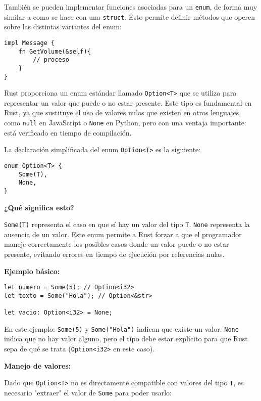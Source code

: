 \documentclass[12pt]{article}
\begin{document}
También se pueden implementar funciones asociadas para un \texttt{enum}, de forma muy similar a como se hace con una \texttt{struct}. Esto permite definir métodos que operen sobre las distintas variantes del enum:

\begin{lstlisting}[style=ruststyle]
impl Message {
	fn GetVolume(&self){
		// proceso
	} 
}
\end{lstlisting}

Rust proporciona un enum estándar llamado \texttt{Option<T>} que se utiliza para representar un valor que puede o no estar presente. Este tipo es fundamental en Rust, ya que sustituye el uso de valores nulos que existen en otros lenguajes, como \texttt{null} en JavaScript o \texttt{None} en Python, pero con una ventaja importante: está verificado en tiempo de compilación.

La declaración simplificada del enum \texttt{Option<T>} es la siguiente:

\begin{lstlisting}[style=ruststyle]
enum Option<T> {
	Some(T),
	None,
}
\end{lstlisting}

\textbf{¿Qué significa esto?}

\texttt{Some(T)} representa el caso en que sí hay un valor del tipo \texttt{T}. \texttt{None} representa la ausencia de un valor. Este enum permite a Rust forzar a que el programador maneje correctamente los posibles casos donde un valor puede o no estar presente, evitando errores en tiempo de ejecución por referencias nulas.

\textbf{Ejemplo básico:}

\begin{lstlisting}[style=ruststyle]
let numero = Some(5); // Option<i32>
let texto = Some("Hola"); // Option<&str>
	
let vacio: Option<i32> = None;
\end{lstlisting}

En este ejemplo: \texttt{Some(5)} y \texttt{Some("Hola")} indican que existe un valor. \texttt{None} indica que no hay valor alguno, pero el tipo debe estar explícito para que Rust sepa de qué se trata (\texttt{Option<i32>} en este caso).

\textbf{Manejo de valores:}

Dado que \texttt{Option<T>} no es directamente compatible con valores del tipo \texttt{T}, es necesario "extraer" el valor de \texttt{Some} para poder usarlo:
\end{document}
